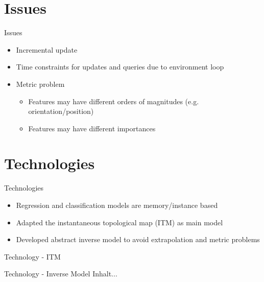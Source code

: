 \documentclass{beamer}
\begin{document}
\section{Issues}
\begin{frame}{Issues}
\begin{itemize}
\item Incremental update
\item Time constraints for updates and queries due to environment loop
\item Metric problem
\begin{itemize}
	\item Features may have different orders of magnitudes (e.g. orientation/position)
	\item Features may have different importances
\end{itemize}
\end{itemize}
\end{frame}

\section{Technologies}
\begin{frame}{Technologies}
\begin{itemize}
\item Regression and classification models are memory/instance based
\item Adapted the instantaneous topological map (ITM) as main model
\item Developed abstract inverse model to avoid extrapolation and metric problems 
\end{itemize}
\end{frame}

\begin{frame}{Technology - ITM}

\end{frame}

\begin{frame}{Technology - Inverse Model}
Inhalt...
\end{frame}
\end{document}
